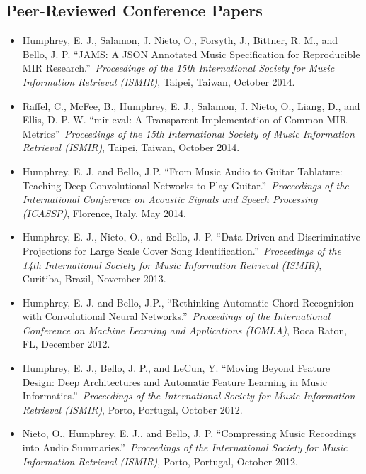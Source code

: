 \subsection{Peer-Reviewed Conference Papers}
\vspace{1em}
\begin{itemize}
\onehalfspacing

\item Humphrey, E. J., Salamon, J. Nieto, O., Forsyth, J., Bittner, R. M., and Bello, J. P. ``JAMS: A JSON Annotated Music Specification for Reproducible MIR Research.''~{\it Proceedings of the 15th International Society for Music Information Retrieval (ISMIR)}, Taipei, Taiwan, October 2014.

\item Raffel, C., McFee, B., Humphrey, E. J., Salamon, J. Nieto, O., Liang, D., and Ellis, D. P. W. ``mir eval: A Transparent Implementation of Common MIR Metrics''~{\it Proceedings of the 15th International Society of Music Information Retrieval (ISMIR)}, Taipei, Taiwan, October 2014.

\item Humphrey, E. J. and Bello, J.P. ``From Music Audio to Guitar Tablature: Teaching Deep Convolutional Networks to Play Guitar.''~{\it Proceedings of the International Conference on Acoustic Signals and Speech Processing (ICASSP)}, Florence, Italy, May 2014.

\item Humphrey, E. J., Nieto, O., and Bello, J. P. ``Data Driven and Discriminative Projections for Large Scale Cover Song Identification.''~{\it Proceedings of the 14th International Society for Music Information Retrieval (ISMIR)}, Curitiba, Brazil, November 2013.

\item Humphrey, E. J. and Bello, J.P., ``Rethinking Automatic Chord Recognition with Convolutional Neural Networks.''~{\it Proceedings of the International Conference on Machine Learning and Applications (ICMLA)}, Boca Raton, FL, December 2012.

\item Humphrey, E. J., Bello, J. P., and LeCun, Y. ``Moving Beyond Feature Design: Deep Architectures and Automatic Feature Learning in Music Informatics.''~{\it Proceedings of the International Society for Music Information Retrieval (ISMIR)}, Porto, Portugal, October 2012.

\item Nieto, O.,  Humphrey, E. J., and Bello, J. P. ``Compressing Music Recordings into Audio Summaries.''~{\it Proceedings of the International Society for Music Information Retrieval (ISMIR)}, Porto, Portugal, October 2012.


\end{itemize}
